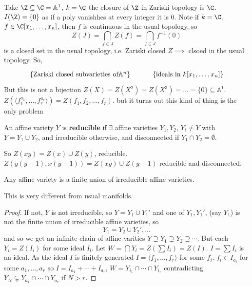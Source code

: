 \documentclass{article}
\newcommand{\A}{\mathbb{A}}
\begin{document}
Take $\Z \subseteq \C = \A^1$, $k = \C$ the closure of $\Z$ in Zariski topology is $\C$. $I(\Z) = \{0\}$ as if a poly vanishhes at every integer it is 0.
Note if $k = \C$, $f \in \C[x_1, \dotsc, x_n]$, then $f$ is continuous in the usual topology, so
\begin{equation*}
    Z(J) = \bigcap_{f \in J} Z(f) = \bigcap_{f \in J} f^{-1}(0)
\end{equation*}
is a closed set in the usual topology, i.e. Zariski closed $Z \implies$ clsoed in the usual topology.
So,
\begin{equation*}
\begin{tikzcd}
    \{\text{Zariski closed subvarieties of} \A^n\} & \{\text{ideals in } k[x_1, \dotsc, x_n]\}
\end{tikzcd}
\end{equation*}
But this is not a bijection
$Z(X) = Z(X^2) = Z(X^3) = \dotsc = \{0\} \subseteq \A^1$. $Z(\langle f_1^{a_1}, \dotsc, f_r^{a_r}\rangle) = Z(f_1, f_2, \dotsc, f_r)$.
but it turns out this kind of thing is the only problem %
\begin{defi}
    An affine variety $Y$ is \textbf{reducible} if $\exists$ affine varieties $Y_1, Y_2$, $Y_i \neq Y$ with $Y = Y_1 \cup Y_2$, and irreducible otherwise, and disconnected if $Y_1 \cap Y_2 = \emptyset$.
\end{defi}
So $Z(xy) = Z(x) \cup Z(y)$, reducible.
$Z(y(y-1), x(y-1)) = Z(xy) \cup Z(y-1)$ reducible and disconnected.
\begin{prop}
    Any affine variety is a finite union of irreducible affine varieties.
\end{prop}
\begin{remark}
    This is very different from usual manifolds.
\end{remark}
\begin{proof}
    If not, $Y$ is not irreducible, so $Y = Y_1 \cup Y_1'$ and one of $Y_1, Y_1'$, (say $Y_1$) is not the finite union of irreducible affine varieties, so
    \begin{equation*}
        Y_1 = Y_2 \cup Y_2', \dotsc
    \end{equation*}
    and so we get an infinite chain of affine varities $Y \supsetneq Y_1 \supsetneq Y_2 \supsetneq \dotsb$.
    But each $Y_i = Z(I_i)$ for some ideal $I_l$. Let $W = \bigcap Y_l = Z(\sum I_i) = Z(I)$.
    $I = \sum I_i$ is an ideal. As the ideal $I$ is finitely generated $I = \langle f_1, \dotsc, f_r \rangle$ for some $f_i$.
    $f_i \in I_{a_i}$ for some $a_1, \dotsc, a_r$ so $I = I_{a_1} + \dotsb + I_{a_r}$, $W = Y_{i_1} \cap \dotsb \cap Y_{i_r}$ contradicting $Y_N \subsetneq Y_{a_1} \cap \dotsb \cap Y_{a_r}$ if $N > r$.
\end{proof}
\end{document}
